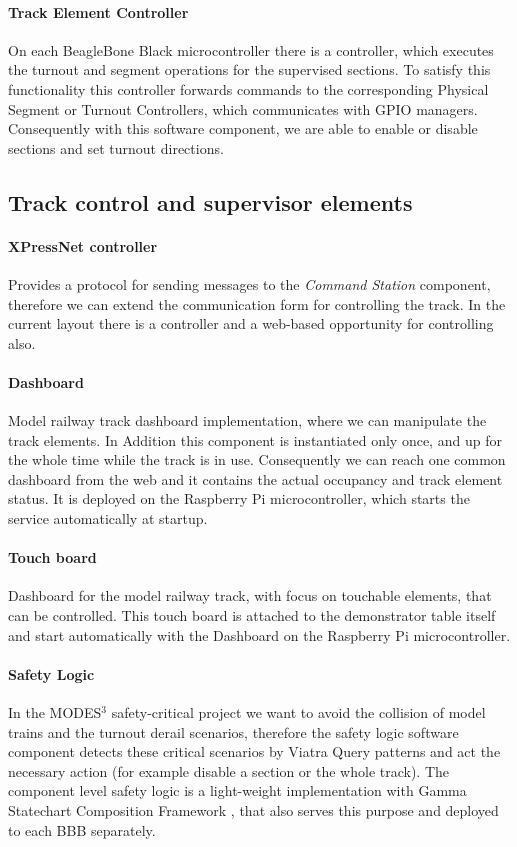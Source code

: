 \paragraph{Track Element Controller}
On each BeagleBone Black microcontroller there is a controller, which executes the turnout and segment operations for the supervised sections. To satisfy this functionality this controller forwards commands to the corresponding Physical Segment or Turnout Controllers, which communicates with GPIO managers. Consequently with this software component, we are able to enable or disable sections and set turnout directions.

\subsection{Track control and supervisor elements}
\paragraph{XPressNet controller}
Provides a protocol for sending messages to the \textit{Command Station} component, therefore we can extend the communication form for controlling the track. In the current layout there is a controller and a web-based opportunity for controlling also.
\paragraph{Dashboard}
Model railway track dashboard implementation, where we can manipulate the track elements. In Addition this component is instantiated only once, and up for the whole time while the track is in use. Consequently we can reach one common dashboard from the web and it contains the actual occupancy and track element status. It is deployed on the Raspberry Pi microcontroller, which starts the service automatically at startup.
\paragraph{Touch board}
Dashboard for the model railway track, with focus on touchable elements, that can be controlled. This touch board is attached to the demonstrator table itself and start automatically with the Dashboard on the Raspberry Pi microcontroller.
\paragraph{Safety Logic}
In the MODES$^3$ safety-critical project we want to avoid the collision of model trains and the turnout derail scenarios, therefore the safety logic software component detects these critical scenarios by Viatra Query \cite{Viatra} patterns and act the necessary action (for example disable a section or the whole track). The component level safety logic is a light-weight implementation with Gamma Statechart Composition Framework \cite{Gamma}, that also serves this purpose and deployed to each BBB separately.

